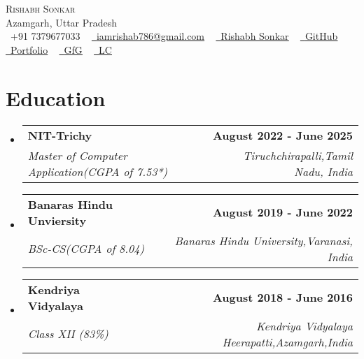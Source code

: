 \documentclass[letterpaper,11pt]{article}
\makeatletter
\newcommand{\resumeSubheading}[4]{
  \vspace{0pt}\item
	\begin{tabular*}{1.0\textwidth}[t]{l@{\extracolsep{\fill}}r}
  	\textbf{#1} & \textbf{\small #2} \\
  	\textit{\small#3} & \textit{\small #4} \\
	\end{tabular*}\vspace{-5pt}
}
\newcommand{\resumeSubHeadingListStart}{\begin{itemize}[leftmargin=0.0in, label={}, itemsep=3pt]}
\newcommand{\resumeSubHeadingListEnd}{\end{itemize}}
\makeatother
\begin{document}

\begin{center}
	{\Huge \scshape Rishabh Sonkar} \\ \vspace{5pt}
	Azamgarh, Uttar Pradesh \\ \vspace{5pt}
	\small \raisebox{-0.1\height}{\color{skyblue}\faPhone}\ +91 7379677033 ~ 
        \href{mailto:iamrishab786@gmail.com}{\raisebox{-0.2\height}{\color{skyblue}\faEnvelope}\  \underline{iamrishab786@gmail.com}} ~
        \href{https://www.linkedin.com/in/rishabh-sonkar/}{\raisebox{-0.2\height}{\color{skyblue}\faLinkedin}\ \underline{Rishabh Sonkar}} ~
        \href{https://github.com/RishabhSkr}{\raisebox{-0.2\height}{\color{skyblue}\faGithub}\ \underline{GitHub}}
        \hspace{0.5pt}
        \href{https://portfolio-website-main-ten-iota.vercel.app/}{\raisebox{-0.2\height}{\color{skyblue}\faBriefcase}\ \underline{Portfolio}} ~
        \href{https://www.geeksforgeeks.org/user/rsonkar882/}{\raisebox{-0.2\height}{\color{skyblue}\faCode}\ \underline{GfG}} ~
        \href{https://leetcode.com/u/RishabhSkr/}{\raisebox{-0.2\height}{\color{skyblue}\faLaptopCode}\ \underline{LC}}
        \vspace{3pt}
\end{center}

\vspace{2pt}

\section{{\color{skyblue}  Education}}
  \resumeSubHeadingListStart
	\resumeSubheading
  	{NIT-Trichy}{August 2022 - June 2025}
  	{Master of Computer Application(CGPA of 7.53*)}{Tiruchchirapalli,Tamil Nadu, India}
   \resumeSubheading
  	{Banaras Hindu Unviersity}{August 2019 - June 2022}
  	{BSc-CS(CGPA of 8.04)}{Banaras Hindu University,Varanasi, India}
    \resumeSubheading
  	{Kendriya Vidyalaya}{August 2018 - June 2016}
  	{Class XII (83\%)}{Kendriya Vidyalaya Heerapatti,Azamgarh,India}
  \resumeSubHeadingListEnd
\end{document}
